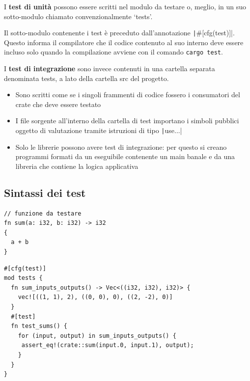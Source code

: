 I \textbf{test di unità} possono essere scritti nel modulo da testare o, meglio, in un
suo sotto-modulo chiamato convenzionalmente `tests'.

Il sotto-modulo contenente i test è preceduto dall'annotazione \texttt|#[cfg(test)]|.
Questo informa il compilatore che il codice contenuto al suo interno deve essere
incluso solo quando la compilazione avviene con il comando \verb|cargo test|.\newline

I \textbf{test di integrazione} sono invece contenuti in una cartella separata denominata
tests, a lato della cartella src del progetto.

\begin{itemize}
  \item Sono scritti come se i singoli frammenti di codice fossero i
        consumatori del crate che deve essere testato
  \item I file sorgente all'interno della cartella di test importano i simboli
        pubblici oggetto di valutazione tramite istruzioni di tipo \texttt|use...|
  \item Solo le librerie possono avere test di integrazione: per questo si
        creano programmi formati da un eseguibile contenente un main banale e da una
        libreria che contiene la logica applicativa
\end{itemize}

\subsection{Sintassi dei test}


\begin{center}
  \begin{minipage}{0.3\linewidth}
    \begin{verbatim}
// funzione da testare
fn sum(a: i32, b: i32) -> i32 
{
  a + b
}
\end{verbatim}

  \end{minipage}
  \hfill
  \begin{minipage}{0.65\linewidth}
    \begin{verbatim}
#[cfg(test)]
mod tests {
  fn sum_inputs_outputs() -> Vec<((i32, i32), i32)> {
    vec![((1, 1), 2), ((0, 0), 0), ((2, -2), 0)]
  }
  #[test]
  fn test_sums() {
    for (input, output) in sum_inputs_outputs() {
     assert_eq!(crate::sum(input.0, input.1), output);
    }
  }
}
\end{verbatim}

  \end{minipage}
\end{center}


